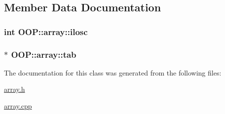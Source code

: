 \subsection{\-Member \-Data \-Documentation}
\hypertarget{classOOP_1_1array_a22f31b91340f38f9acd0ed21814fff86}{
\subsubsection[{ilosc}]{\setlength{\rightskip}{0pt plus 5cm}int {\bf \-O\-O\-P\-::array\-::ilosc}}}\label{classOOP_1_1array_a22f31b91340f38f9acd0ed21814fff86}
\hypertarget{classOOP_1_1array_aad69708fa28a7012340355dcb8866ae3}{
\subsubsection[{tab}]{$\ast$ {\bf \-O\-O\-P\-::array\-::tab}}}\label{classOOP_1_1array_aad69708fa28a7012340355dcb8866ae3}


\-The documentation for this class was generated from the following files\-:\begin{DoxyCompactItemize}
\item 
\hyperlink{array_8h}{array.\-h}\item 
\hyperlink{array_8cpp}{array.\-cpp}\end{DoxyCompactItemize}
